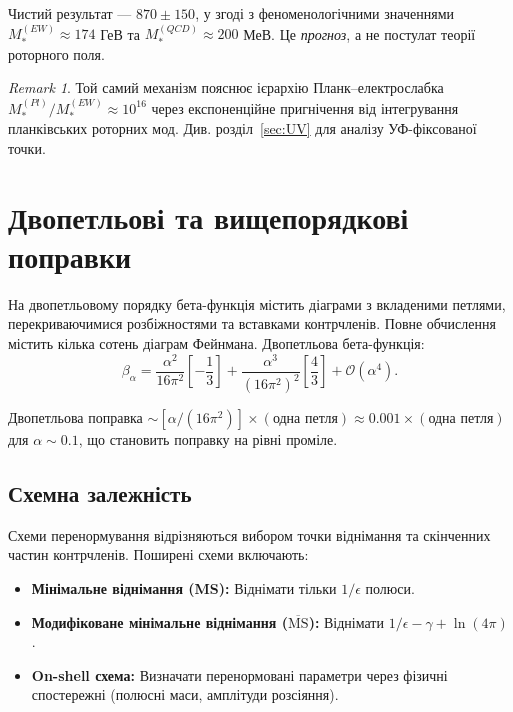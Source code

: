 \documentclass[11pt,a4paper]{article}
\numberwithin{equation}{section}
\theoremstyle{plain}
\theoremstyle{definition}
\theoremstyle{remark}
\newtheorem{remark}[theorem]{Remark}
\begin{document}
Чистий результат — $870\pm 150$, у згоді з феноменологічними значеннями $M_*^{(EW)}\approx 174$ ГеВ та $M_*^{(QCD)}\approx 200$ МеВ. Це \emph{прогноз}, а не постулат теорії роторного поля.

\begin{remark}
Той самий механізм пояснює ієрархію Планк–електрослабка $M_*^{(Pl)}/M_*^{(EW)}\approx 10^{16}$ через експоненційне пригнічення від інтегрування планківських роторних мод. Див. розділ~\ref{sec:UV} для аналізу УФ-фіксованої точки.
\end{remark}

\vspace{1em}

\section{Двопетльові та вищепорядкові поправки}\label{sec:twoloop}

На двопетльовому порядку бета-функція містить діаграми з вкладеними петлями, перекриваючимися розбіжностями та вставками контрчленів. Повне обчислення містить кілька сотень діаграм Фейнмана. Двопетльова бета-функція:
\begin{equation}
\beta_\alpha = \frac{\alpha^2}{16\pi^2}\left[-\frac{1}{3}\right] + \frac{\alpha^3}{(16\pi^2)^2}\left[\frac{4}{3}\right] + \mathcal{O}(\alpha^4).
\label{eq:beta-alpha-2loop-nf3}
\end{equation}

Двопетльова поправка $\sim [\alpha/(16\pi^2)]\times(\text{одна петля}) \approx 0{.}001\times(\text{одна петля})$ для $\alpha\sim 0{.}1$, що становить поправку на рівні проміле.

\subsection{Схемна залежність}

Схеми перенормування відрізняються вибором точки віднімання та скінченних частин контрчленів. Поширені схеми включають:
\begin{itemize}
  \item \textbf{Мінімальне віднімання (MS):} Віднімати тільки $1/\epsilon$ полюси.
  \item \textbf{Модифіковане мінімальне віднімання ($\overline{\text{MS}}$):} Віднімати $1/\epsilon - \gamma + \ln(4\pi)$.
  \item \textbf{On-shell схема:} Визначати перенормовані параметри через фізичні спостережні (полюсні маси, амплітуди розсіяння).
\end{itemize}
\end{document}
